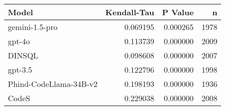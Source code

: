 \begin{tabular}{lrrr}
\toprule
Model & Kendall-Tau & P Value & n \\
\midrule
gemini-1.5-pro & 0.069195 & 0.000265 & 1978 \\
gpt-4o & 0.113739 & 0.000000 & 2009 \\
DINSQL & 0.098608 & 0.000000 & 2007 \\
gpt-3.5 & 0.122796 & 0.000000 & 1998 \\
Phind-CodeLlama-34B-v2 & 0.198193 & 0.000000 & 1936 \\
CodeS & 0.229038 & 0.000000 & 2008 \\
\bottomrule
\end{tabular}
